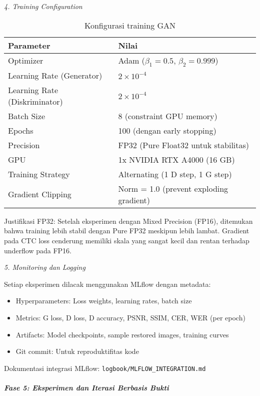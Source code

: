 \documentclass[12pt,a4paper]{article}
\begin{document}
\textit{4. Training Configuration}

\begin{table}[H]
\centering
\caption{Konfigurasi training GAN}
\label{tab:training-config}
\small
\begin{tabular}{|l|l|}
\hline
\textbf{Parameter} & \textbf{Nilai} \\ \hline
Optimizer & Adam ($\beta_1=0.5$, $\beta_2=0.999$) \\ \hline
Learning Rate (Generator) & $2 \times 10^{-4}$ \\ \hline
Learning Rate (Diskriminator) & $2 \times 10^{-4}$ \\ \hline
Batch Size & 8 (constraint GPU memory) \\ \hline
Epochs & 100 (dengan early stopping) \\ \hline
Precision & FP32 (Pure Float32 untuk stabilitas) \\ \hline
GPU & 1x NVIDIA RTX A4000 (16 GB) \\ \hline
Training Strategy & Alternating (1 D step, 1 G step) \\ \hline
Gradient Clipping & Norm = 1.0 (prevent exploding gradient) \\ \hline
\end{tabular}
\end{table}

Justifikasi FP32: Setelah eksperimen dengan Mixed Precision (FP16), ditemukan bahwa training lebih stabil dengan Pure FP32 meskipun lebih lambat. Gradient pada CTC loss cenderung memiliki skala yang sangat kecil dan rentan terhadap underflow pada FP16.

\textit{5. Monitoring dan Logging}

Setiap eksperimen dilacak menggunakan MLflow dengan metadata:
\begin{itemize}[leftmargin=*, nosep]
\item Hyperparameters: Loss weights, learning rates, batch size
\item Metrics: G loss, D loss, D accuracy, PSNR, SSIM, CER, WER (per epoch)
\item Artifacts: Model checkpoints, sample restored images, training curves
\item Git commit: Untuk reproduktifitas kode
\end{itemize}

Dokumentasi integrasi MLflow: \texttt{logbook/MLFLOW\_INTEGRATION.md}

\subparagraph{Fase 5: Eksperimen dan Iterasi Berbasis Bukti}
\end{document}
